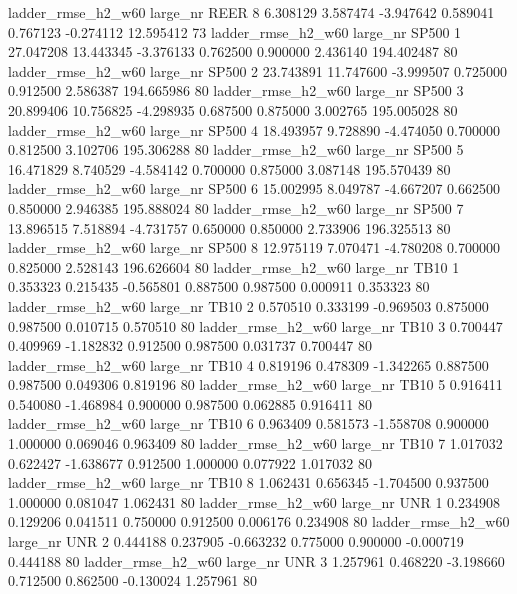  ladder_rmse_h2_w60   large_nr     REER                 8  6.308129  3.587474  -3.947642 0.589041 0.767123 -0.274112   12.595412 73
 ladder_rmse_h2_w60   large_nr    SP500                 1 27.047208 13.443345  -3.376133 0.762500 0.900000  2.436140  194.402487 80
 ladder_rmse_h2_w60   large_nr    SP500                 2 23.743891 11.747600  -3.999507 0.725000 0.912500  2.586387  194.665986 80
 ladder_rmse_h2_w60   large_nr    SP500                 3 20.899406 10.756825  -4.298935 0.687500 0.875000  3.002765  195.005028 80
 ladder_rmse_h2_w60   large_nr    SP500                 4 18.493957  9.728890  -4.474050 0.700000 0.812500  3.102706  195.306288 80
 ladder_rmse_h2_w60   large_nr    SP500                 5 16.471829  8.740529  -4.584142 0.700000 0.875000  3.087148  195.570439 80
 ladder_rmse_h2_w60   large_nr    SP500                 6 15.002995  8.049787  -4.667207 0.662500 0.850000  2.946385  195.888024 80
 ladder_rmse_h2_w60   large_nr    SP500                 7 13.896515  7.518894  -4.731757 0.650000 0.850000  2.733906  196.325513 80
 ladder_rmse_h2_w60   large_nr    SP500                 8 12.975119  7.070471  -4.780208 0.700000 0.825000  2.528143  196.626604 80
 ladder_rmse_h2_w60   large_nr     TB10                 1  0.353323  0.215435  -0.565801 0.887500 0.987500  0.000911    0.353323 80
 ladder_rmse_h2_w60   large_nr     TB10                 2  0.570510  0.333199  -0.969503 0.875000 0.987500  0.010715    0.570510 80
 ladder_rmse_h2_w60   large_nr     TB10                 3  0.700447  0.409969  -1.182832 0.912500 0.987500  0.031737    0.700447 80
 ladder_rmse_h2_w60   large_nr     TB10                 4  0.819196  0.478309  -1.342265 0.887500 0.987500  0.049306    0.819196 80
 ladder_rmse_h2_w60   large_nr     TB10                 5  0.916411  0.540080  -1.468984 0.900000 0.987500  0.062885    0.916411 80
 ladder_rmse_h2_w60   large_nr     TB10                 6  0.963409  0.581573  -1.558708 0.900000 1.000000  0.069046    0.963409 80
 ladder_rmse_h2_w60   large_nr     TB10                 7  1.017032  0.622427  -1.638677 0.912500 1.000000  0.077922    1.017032 80
 ladder_rmse_h2_w60   large_nr     TB10                 8  1.062431  0.656345  -1.704500 0.937500 1.000000  0.081047    1.062431 80
 ladder_rmse_h2_w60   large_nr      UNR                 1  0.234908  0.129206   0.041511 0.750000 0.912500  0.006176    0.234908 80
 ladder_rmse_h2_w60   large_nr      UNR                 2  0.444188  0.237905  -0.663232 0.775000 0.900000 -0.000719    0.444188 80
 ladder_rmse_h2_w60   large_nr      UNR                 3  1.257961  0.468220  -3.198660 0.712500 0.862500 -0.130024    1.257961 80
